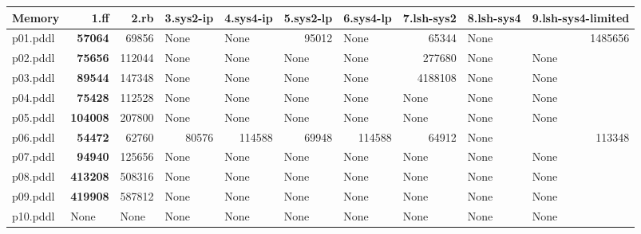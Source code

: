 \documentclass{article}
\begin{document}
\begin{tabular}{@{}lrrrrrrrrr@{}}
Memory & 1.ff & 2.rb & 3.sys2-ip & 4.sys4-ip & 5.sys2-lp & 6.sys4-lp & 7.lsh-sys2 & 8.lsh-sys4 & 9.lsh-sys4-limited \\
\midrule
p01.pddl & \textbf{57064} & 69856 & \multicolumn{1}{|l|}{None} & \multicolumn{1}{|l|}{None} & 95012 & \multicolumn{1}{|l|}{None} & 65344 & \multicolumn{1}{|l|}{None} & 1485656 \\
p02.pddl & \textbf{75656} & 112044 & \multicolumn{1}{|l|}{None} & \multicolumn{1}{|l|}{None} & \multicolumn{1}{|l|}{None} & \multicolumn{1}{|l|}{None} & 277680 & \multicolumn{1}{|l|}{None} & \multicolumn{1}{|l|}{None} \\
p03.pddl & \textbf{89544} & 147348 & \multicolumn{1}{|l|}{None} & \multicolumn{1}{|l|}{None} & \multicolumn{1}{|l|}{None} & \multicolumn{1}{|l|}{None} & 4188108 & \multicolumn{1}{|l|}{None} & \multicolumn{1}{|l|}{None} \\
p04.pddl & \textbf{75428} & 112528 & \multicolumn{1}{|l|}{None} & \multicolumn{1}{|l|}{None} & \multicolumn{1}{|l|}{None} & \multicolumn{1}{|l|}{None} & \multicolumn{1}{|l|}{None} & \multicolumn{1}{|l|}{None} & \multicolumn{1}{|l|}{None} \\
p05.pddl & \textbf{104008} & 207800 & \multicolumn{1}{|l|}{None} & \multicolumn{1}{|l|}{None} & \multicolumn{1}{|l|}{None} & \multicolumn{1}{|l|}{None} & \multicolumn{1}{|l|}{None} & \multicolumn{1}{|l|}{None} & \multicolumn{1}{|l|}{None} \\
p06.pddl & \textbf{54472} & 62760 & 80576 & 114588 & 69948 & 114588 & 64912 & \multicolumn{1}{|l|}{None} & 113348 \\
p07.pddl & \textbf{94940} & 125656 & \multicolumn{1}{|l|}{None} & \multicolumn{1}{|l|}{None} & \multicolumn{1}{|l|}{None} & \multicolumn{1}{|l|}{None} & \multicolumn{1}{|l|}{None} & \multicolumn{1}{|l|}{None} & \multicolumn{1}{|l|}{None} \\
p08.pddl & \textbf{413208} & 508316 & \multicolumn{1}{|l|}{None} & \multicolumn{1}{|l|}{None} & \multicolumn{1}{|l|}{None} & \multicolumn{1}{|l|}{None} & \multicolumn{1}{|l|}{None} & \multicolumn{1}{|l|}{None} & \multicolumn{1}{|l|}{None} \\
p09.pddl & \textbf{419908} & 587812 & \multicolumn{1}{|l|}{None} & \multicolumn{1}{|l|}{None} & \multicolumn{1}{|l|}{None} & \multicolumn{1}{|l|}{None} & \multicolumn{1}{|l|}{None} & \multicolumn{1}{|l|}{None} & \multicolumn{1}{|l|}{None} \\
p10.pddl & \multicolumn{1}{|l|}{None} & \multicolumn{1}{|l|}{None} & \multicolumn{1}{|l|}{None} & \multicolumn{1}{|l|}{None} & \multicolumn{1}{|l|}{None} & \multicolumn{1}{|l|}{None} & \multicolumn{1}{|l|}{None} & \multicolumn{1}{|l|}{None} & \multicolumn{1}{|l|}{None} \\

\end{tabular}
\end{document}
